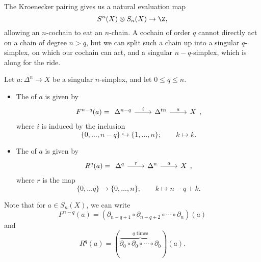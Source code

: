 \documentclass[main.tex]{subfiles}
\begin{document}
The Kroenecker pairing gives us a natural evaluation map
\begin{equation*}
  S^{n}(X) \otimes S_{n}(X) \to \Z,
\end{equation*}
allowing an $n$-cochain to eat an $n$-chain. A cochain of order $q$ cannot directly act on a chain of degree $n > q$, but we can split such a chain up into a singular $q$-simplex, on which our cochain can act, and a singular $n-q$-simplex, which is along for the ride.

\begin{definition}
  \label{def:front_rear_face}
  Let $a\colon \Delta^{n} \to X$ be a singular $n$-simplex, and let $0 \leq q \leq n$.
  \begin{itemize}
    \item The  of $a$ is given by
      \begin{equation*}
        F^{n-q}(a) =
        \begin{tikzcd}
          \Delta^{n-q}
          \arrow[r, "i"]
          & \Delta^{tn}
          \arrow[r, "a"]
          & X
        \end{tikzcd},
      \end{equation*}
      where $i$ is induced by the inclusion
      \begin{equation*}
        \{0, \ldots, n-q\} \hookrightarrow \{1, \ldots, n \};\qquad k \mapsto k.
      \end{equation*}

    \item The  of $a$ is given by
      \begin{equation*}
        R^{q}(a) =
        \begin{tikzcd}
          \Delta^{q}
          \arrow[r, "r"]
          & \Delta^{n}
          \arrow[r, "a"]
          & X
        \end{tikzcd},
      \end{equation*}
      where $r$ is the map
      \begin{equation*}
        \{0, \ldots q\} \to \{0, \ldots, n\};\qquad k \mapsto n-q+k.
      \end{equation*}
  \end{itemize}
\end{definition}

Note that for $a \in S_{n}(X)$, we can write
\begin{equation*}
  F^{n-q}(a) = (\partial_{n-q+1} \circ \partial_{n-q+2} \circ \cdots \circ \partial_{n})(a)
\end{equation*}
and
\begin{equation*}
  R^{q}(a) = (\overbrace{\partial_{0} \circ \partial_{0} \circ \cdots \circ \partial_{0}}^{q\text{ times}}) (a).
\end{equation*}
\end{document}
